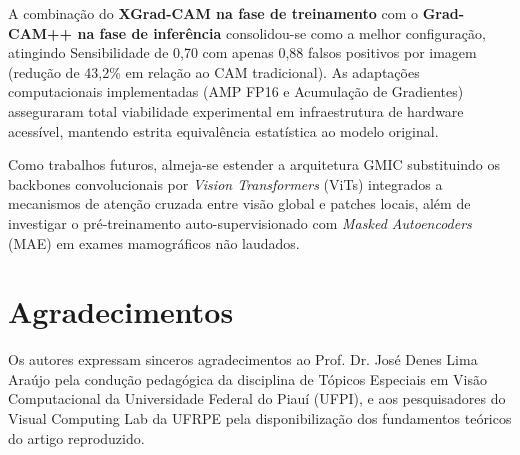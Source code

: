 \documentclass[12pt]{article}
\begin{document}
A combinação do \textbf{XGrad-CAM na fase de treinamento} com o \textbf{Grad-CAM++ na fase de inferência} consolidou-se como a melhor configuração, atingindo Sensibilidade de 0,70 com apenas 0,88 falsos positivos por imagem (redução de 43,2\% em relação ao CAM tradicional). As adaptações computacionais implementadas (AMP FP16 e Acumulação de Gradientes) asseguraram total viabilidade experimental em infraestrutura de hardware acessível, mantendo estrita equivalência estatística ao modelo original.

Como trabalhos futuros, almeja-se estender a arquitetura GMIC substituindo os backbones convolucionais por \textit{Vision Transformers} (ViTs) integrados a mecanismos de atenção cruzada entre visão global e patches locais, além de investigar o pré-treinamento auto-supervisionado com \textit{Masked Autoencoders} (MAE) em exames mamográficos não laudados.

\section*{Agradecimentos}

Os autores expressam sinceros agradecimentos ao Prof. Dr. José Denes Lima Araújo pela condução pedagógica da disciplina de Tópicos Especiais em Visão Computacional da Universidade Federal do Piauí (UFPI), e aos pesquisadores do Visual Computing Lab da UFRPE pela disponibilização dos fundamentos teóricos do artigo reproduzido.



\end{document}
